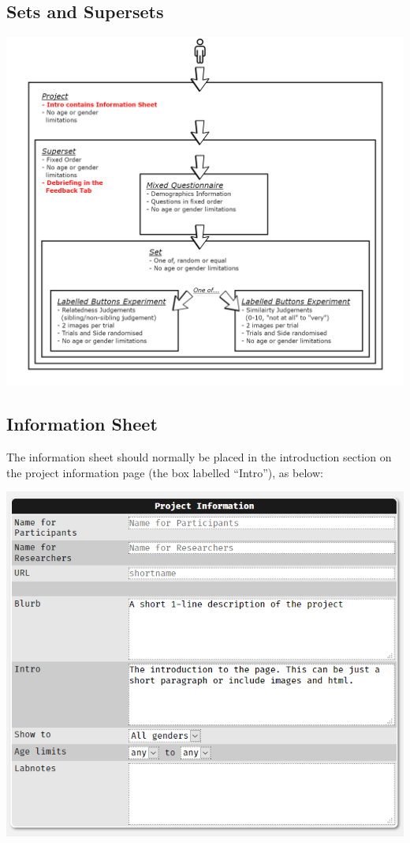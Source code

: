 \documentclass[]{book}
\begin{document}
\subsection{Sets and Supersets}\label{sets-and-supersets}

\includegraphics{images/screenshots/structure.png}

\subsection{Information Sheet}\label{info_sheet}

The information sheet should normally be placed in the introduction
section on the project information page (the box labelled ``Intro''), as
below:

\includegraphics{images/screenshots/proj_3.png}
\end{document}

